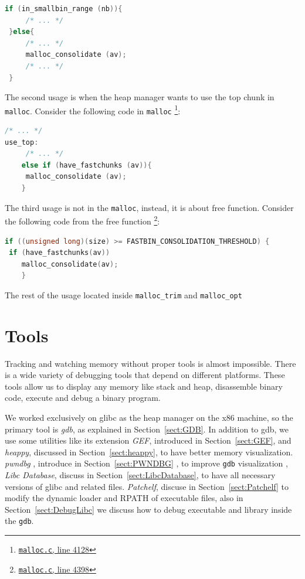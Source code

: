 \documentclass{masterthesis}
\newcommand*\libc{glibc}
\newcommand*\mallocc{\lstinline{malloc}\xspace}
\newcommand{\glnote}[1]{\todo[color=yellow!20]{#1}}
\newcommand{\refToSection}[1]{Section~\ref{sect:#1}\xspace}
\begin{document}
\begin{lstlisting}[language=c,frame=tlrb]
 if (in_smallbin_range (nb)){
 	 /* ... */
 }else{
	 /* ... */
	 malloc_consolidate (av);
	 /* ... */
 }
\end{lstlisting}

The second usage is when the heap manager wants to use the top chunk in \mallocc{}. Consider the following code in \mallocc{} \footnote{\href{https://sourceware.org/git/?p=glibc.git;a=blob;f=malloc/malloc.c;h=f7cd29bc2f93e1082ee77800bd64a4b2a2897055;hb=9ea3686266dca3f004ba874745a4087a89682617\#l4128}{\texttt{malloc.c}, line 4128}}:

\begin{lstlisting}[language=c,frame=tlrb]
 /* ... */
use_top:
	 /* ... */
	else if (have_fastchunks (av)){
	 malloc_consolidate (av);
	}
\end{lstlisting}

The third usage is not in the \mallocc{}, instead, it is about free function. Consider the following code from the free function \footnote{\href{https://sourceware.org/git/?p=glibc.git;a=blob;f=malloc/malloc.c;h=f7cd29bc2f93e1082ee77800bd64a4b2a2897055;hb=9ea3686266dca3f004ba874745a4087a89682617\#l4398}{\texttt{malloc.c}, line 4398}}:

\begin{lstlisting}[language=c,frame=tlrb]
if ((unsigned long)(size) >= FASTBIN_CONSOLIDATION_THRESHOLD) {
 if (have_fastchunks(av))
	malloc_consolidate(av);
	}
\end{lstlisting}

The rest of the usage located inside \lstinline{malloc_trim} and \lstinline{malloc_opt}
\chapter{Tools }
Tracking and watching memory without proper tools is almost impossible. There is a wide variety of debugging tools that depend on different platforms. These tools allow us to display any memory like stack and heap, disassemble binary code, execute and debug a binary program.

We worked exclusively on \libc{} as the heap manager on the x86 machine, so the primary tool is \emph{gdb}, as explained in \refToSection{GDB}. In addition to gdb, we use some utilities like its extension \emph{GEF}, introduced in \refToSection{GEF}, and \emph{heappy}, discussed in \refToSection{heappy}, to have better memory visualization. \glnote{DONE-added references to (sub)sections} \emph{pwndbg} , introduce in \refToSection{PWNDBG} , to improve \lstinline{gdb} visualization ,  \emph{Libc Database}, discuss in \refToSection{LibcDatabase}, to have all necessary versions of \libc{} and related files. \emph{Patchelf}, discuse in \refToSection{Patchelf} to modify the dynamic loader and RPATH of executable files, also in \refToSection{DebugLibc} we discuss how to debug executable and library inside the \lstinline{gdb}.
\end{document}
